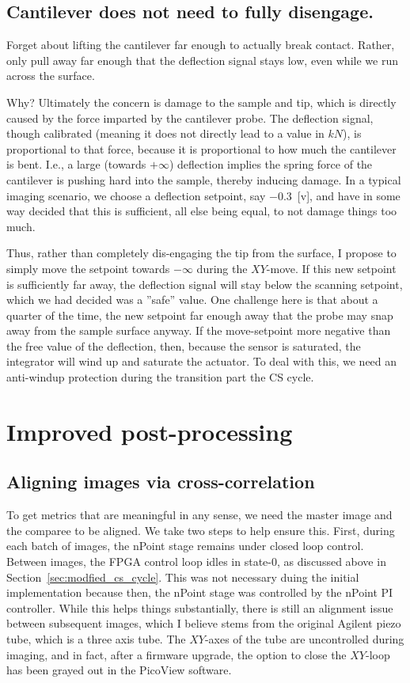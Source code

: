 \documentclass[11pt]{article}
\begin{document}
\subsection{Cantilever does not need to fully disengage.} Forget about lifting the cantilever far enough to actually break contact. Rather, only pull away far enough that the deflection signal stays low, even while we run across the surface.

Why? Ultimately the concern is damage to the sample and tip, which is directly caused by the force imparted by the cantilever probe. The deflection signal, though calibrated (meaning it does not directly lead to a value in $kN$), is proportional to that force, because it is proportional to how much the cantilever is bent. I.e., a large (towards $+\infty$) deflection implies the spring force of the cantilever is pushing hard into the sample, thereby inducing damage. In a typical imaging scenario, we choose a deflection setpoint, say $-0.3$~[v], and have in some way decided that this is sufficient, all else being equal, to not damage things too much.

Thus, rather than completely dis-engaging the tip from the surface, I propose to simply move the setpoint towards $-\infty$ during the $XY$-move. If this new setpoint is sufficiently far away, the deflection signal will stay below the scanning setpoint, which we had decided was a ''safe'' value. One challenge here is that about a quarter of the time, the new setpoint far enough away that the probe may snap away from the sample surface anyway. If the move-setpoint more negative than the free value of the deflection, then, because the sensor is saturated, the integrator will wind up and saturate the actuator. To deal with this, we need an anti-windup protection during the transition part the CS cycle.


\section{Improved post-processing}
\subsection{Aligning images via cross-correlation}
To get metrics that are meaningful in any sense, we need the master image and the comparee to be aligned.
We take two steps to help ensure this.
First, during each batch of images, the nPoint stage remains under closed loop control.
Between images, the FPGA control loop idles in state-0, as discussed above in Section~\ref{sec:modfied_cs_cycle}.
This was not necessary duing the initial implementation because then, the nPoint stage was controlled by the nPoint PI controller.
While this helps things substantially, there is still an alignment issue between subsequent images, which I believe stems from the original Agilent piezo tube, which is a three axis tube.
The $XY$-axes of the tube are uncontrolled during imaging, and in fact, after a firmware upgrade, the option to close the $XY$-loop has been grayed out in the PicoView software.
\end{document}
